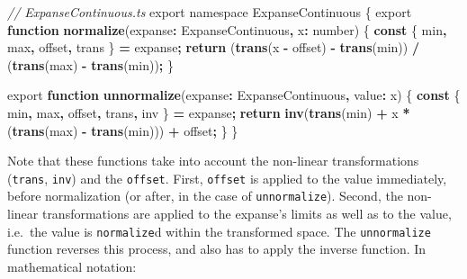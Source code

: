 \documentclass[
  openany]{book}
\newenvironment{Shaded}{\begin{snugshade}}{\end{snugshade}}
\newcommand{\CommentTok}[1]{\textcolor[rgb]{0.56,0.35,0.01}{\textit{#1}}}
\newcommand{\ControlFlowTok}[1]{\textcolor[rgb]{0.13,0.29,0.53}{\textbf{#1}}}
\newcommand{\DataTypeTok}[1]{\textcolor[rgb]{0.13,0.29,0.53}{#1}}
\newcommand{\FunctionTok}[1]{\textcolor[rgb]{0.13,0.29,0.53}{\textbf{#1}}}
\newcommand{\ImportTok}[1]{#1}
\newcommand{\KeywordTok}[1]{\textcolor[rgb]{0.13,0.29,0.53}{\textbf{#1}}}
\newcommand{\NormalTok}[1]{#1}
\newcommand{\OperatorTok}[1]{\textcolor[rgb]{0.81,0.36,0.00}{\textbf{#1}}}
\theoremstyle{definition}
\theoremstyle{definition}
\theoremstyle{definition}
\theoremstyle{definition}
\theoremstyle{remark}
\begin{document}
\begin{Shaded}
\begin{Highlighting}[]
\CommentTok{// ExpanseContinuous.ts}
\ImportTok{export} \ImportTok{namespace} \DataTypeTok{ExpanseContinuous}\NormalTok{ \{}
    \ImportTok{export} \KeywordTok{function} \FunctionTok{normalize}\NormalTok{(expanse}\OperatorTok{:}\NormalTok{ ExpanseContinuous}\OperatorTok{,} 
\NormalTok{                              x}\OperatorTok{:} \DataTypeTok{number}\NormalTok{) \{}
      \KeywordTok{const}\NormalTok{ \{ min}\OperatorTok{,}\NormalTok{ max}\OperatorTok{,}\NormalTok{ offset}\OperatorTok{,}\NormalTok{ trans \} }\OperatorTok{=}\NormalTok{ expanse}\OperatorTok{;}
      \ControlFlowTok{return}\NormalTok{ (}\FunctionTok{trans}\NormalTok{(x }\OperatorTok{{-}}\NormalTok{ offset) }\OperatorTok{{-}} \FunctionTok{trans}\NormalTok{(min)) }\OperatorTok{/} 
\NormalTok{        (}\FunctionTok{trans}\NormalTok{(max) }\OperatorTok{{-}} \FunctionTok{trans}\NormalTok{(min))}\OperatorTok{;}
\NormalTok{  \}}

  \ImportTok{export} \KeywordTok{function} \FunctionTok{unnormalize}\NormalTok{(expanse}\OperatorTok{:}\NormalTok{ ExpanseContinuous}\OperatorTok{,} 
\NormalTok{                              value}\OperatorTok{:}\NormalTok{ x) \{}
      \KeywordTok{const}\NormalTok{ \{ min}\OperatorTok{,}\NormalTok{ max}\OperatorTok{,}\NormalTok{ offset}\OperatorTok{,}\NormalTok{ trans}\OperatorTok{,}\NormalTok{ inv \} }\OperatorTok{=}\NormalTok{ expanse}\OperatorTok{;}
      \ControlFlowTok{return} \FunctionTok{inv}\NormalTok{(}\FunctionTok{trans}\NormalTok{(min) }\OperatorTok{+}\NormalTok{ x }\OperatorTok{*}\NormalTok{ (}\FunctionTok{trans}\NormalTok{(max) }\OperatorTok{{-}} \FunctionTok{trans}\NormalTok{(min))) }\OperatorTok{+} 
\NormalTok{        offset}\OperatorTok{;}
\NormalTok{  \}}
\NormalTok{\}}
\end{Highlighting}
\end{Shaded}

Note that these functions take into account the non-linear transformations (\texttt{trans}, \texttt{inv}) and the \texttt{offset}. First, \texttt{offset} is applied to the value immediately, before normalization (or after, in the case of \texttt{unnormalize}). Second, the non-linear transformations are applied to the expanse's limits as well as to the value, i.e.~the value is \texttt{normalize}d within the transformed space. The \texttt{unnormalize} function reverses this process, and also has to apply the inverse function. In mathematical notation:
\end{document}
